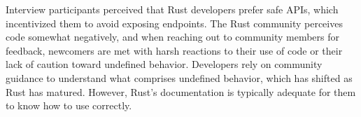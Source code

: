 \rsqfive Interview participants perceived that Rust developers prefer safe APIs, which incentivized them to avoid exposing \unsafe endpoints. The Rust community perceives \unsafe code somewhat negatively, and when reaching out to community members for feedback, newcomers are met with harsh reactions to their use of \unsafe code or their lack of caution toward undefined behavior. Developers rely on community guidance to understand what comprises undefined behavior, which has shifted as Rust has matured. However, Rust's documentation is typically adequate for them to know how to use \unsafe correctly.


